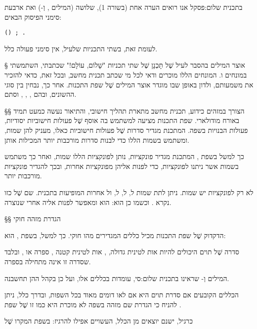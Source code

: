 ב תכנית שלום:פסקל אנו רואים הערה אחת (בשורה 1), שלושה  (המילים
,  וְ-) ואת ארבעת סימני הפיסוק הבאים:

\let\ttfamily=\listingsfont
\begin{verbatim}
() ; .
\end{verbatim}
לעומת זאת, בשתי התכניות שלעיל, אין סימני פעולה כלל.

§ אוצר המילים
בהסבר לעיל שֶׁל תָּכְנָן שֶׁל שתי תכניות "שָׁלוֹם, עוֹלָם!" שכתבתי, השתמשתי במונחים
 ו. המונחים הללו מוכרים
ודאי לכל מי שכתב תכנית מחשב,
ובכל זאת, כדאי להזכיר את משמעותם, ולדון באופן שבו מוגדר אוצר המילים שֶׁל שפת
התכנות. אחר כך, נבחין בין סוגי ה השונים, ובהם
,
, , ו סתם.

§§ הצורך במזהים
כידוע, תכנית מחשב מתארת תהליך חישובי, והתיאור נעשה כמעט תמיד באורח מודולארי.
שפת התכנות מציעה למשתמש בה אוסף שֶׁל פעולות חישוביות יסודיות, פעולות הבנויות
בשפה. המתכנת מגדיר סדרות שֶׁל פעולות חישוביות כאלו, מעניק להן שמות, ומשתמש
בשמות הללו כדי לבנות סדרות מורכבות יותר המכילות אותן.

כך למשל בשפת , המתכנת מגדיר פונקציות, נותן לפונקציות הללו שמות, ואחר כך
משתמש בשמות אשר ניתנו לפונקציות, כדי לפנות אליהן מפונקציות אחרות, ובכך להגדיר
פונקציות מורכבות יותר.

לא רק לפונקציות יש שמות. ניתן לתת שמות ל, ל,
ל, ול
אחרות המופיעות בתכנית. שם שֶׁל  כזו נקרא .
ו כשמו כן הוא: הוא   ומאפשר לפנות אליה אחרי
שנוצרה.

§§ הגדרת מזהה חוקי

הדקדוק שֶׁל שפת התכנות מכיל כללים המגדירים מהו  חוקי.
כך למשל, בשפת ,  הוא:

סדרה שֶׁל תוים היכולים להיות אות לטינית גדולה, ,
אות לטינית קטנה , ספרה  או
,
ובלבד שסדרה זו אינה מתחילה בספרה.

המילים  וְ- שראינו ב תכנית שלום:סי, עומדות בכללים אלו,
ועל כן בקהל ה הן תחשבנה.

הכללים הקובעים אם סדרת תוים היא  אם לאו דומים מאוד בכל השפות,
ובדרך כלל, ניתן להניח כי הגדרת שם מזהה בשפה לא מוכרת היא כמו זו שֶׁל שפת .

כרגיל, ישנם יוצאים מן הכלל, העשויים אפילו להרגיז: בשפת המקרו שֶׁל

